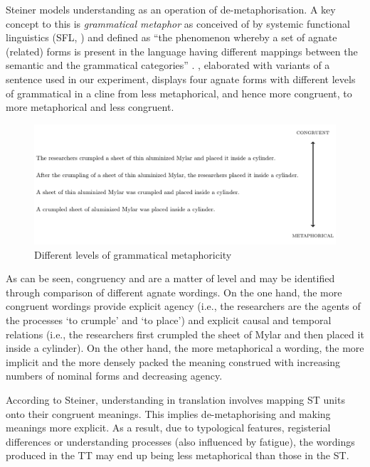 \documentclass[output=paper]{LSP/langsci}
\begin{document}
Steiner models understanding as an operation of de-meta\-phor\-i\-sa\-tion. A key concept to this is \textit{grammatical metaphor} as conceived of by systemic functional linguistics (SFL, \citealt{Halliday1999, Halliday2004}) and defined as ``the phenomenon whereby a set of agnate (related) forms is present in the language having different mappings between the semantic and the grammatical categories'' \citep[7]{Halliday1999}. , elaborated with variants of a sentence used in our experiment, displays four agnate forms with different levels of grammatical  in a cline from less metaphorical, and hence more congruent, to more metaphorical and less congruent.

\begin{figure}
\centering
\includegraphics[width=\textwidth]{figures/silva-pagano/fig1.pdf} %
\caption{Different levels of grammatical metaphoricity}
\label{silva-pagano:fig:1}
\end{figure}

As can be seen, congruency and  are a matter of level and may be identified through comparison of different agnate wordings. On the one hand, the more congruent wordings provide explicit agency (i.e., the researchers are the agents of the processes `to crumple' and `to place') and explicit causal and temporal relations (i.e., the researchers first crumpled the sheet of Mylar and then placed it inside a cylinder). On the other hand, the more metaphorical a wording, the more implicit and the more densely packed the meaning construed with increasing numbers of nominal forms and decreasing agency.

According to Steiner, understanding in translation involves mapping ST units onto their congruent meanings. This implies de-metaphorising and making meanings more explicit. As a result, due to typological features, registerial differences or understanding processes (also influenced by fatigue), the wordings produced in the TT may end up being less metaphorical than those in the ST. 
\end{document}

